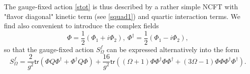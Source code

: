 \documentclass[11pt]{book}
\newcommand{\tr}{\mathsf{tr}}
\theoremstyle{break}
\begin{document}
%
The gauge-fixed action \eqref{stot} is thus described by a rather simple NCFT with "flavor diagonal" kinetic term (see \eqref{squad1}) and quartic interaction terms. We find also convenient to introduce the complex fields%
%
\begin{equation}
\Phi=\frac{1}{2}(\Phi_1+i\Phi_2),\ \Phi^\dag=\frac{1}{2}(\Phi_1-i\Phi_2),
\end{equation}
%
so that the gauge-fixed action $S^f_\Omega$ can be expressed alternatively into the form%
%
\begin{equation}
S^f_\Omega = \frac{2}{g^2} \tr\left( \Phi Q \Phi^\dag + \Phi^\dag Q\Phi \right) + \frac{16}{g^2} \tr\left( (\Omega+1) \Phi\Phi^\dag\Phi\Phi^\dag + (3\Omega-1) \Phi\Phi\Phi^\dag\Phi^\dag \right) .
\label{quasilsz}
\end{equation}
\end{document}
